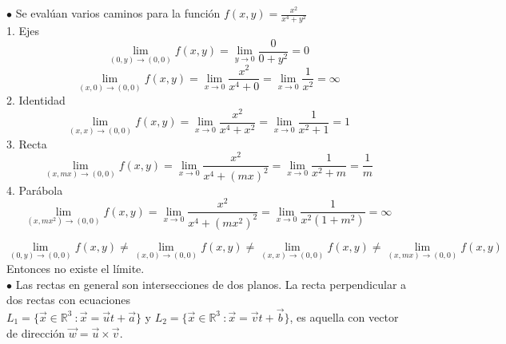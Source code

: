 \documentclass[amsmath,amssymb]{article}
\begin{document}
\noindent $\bullet$ Se evalúan varios caminos para la función $f(x,y)=\frac{x^2}{x^4+y^2}$ \\
1. Ejes \\
$$\lim_{(0,y) \to (0,0)} f(x,y)=\lim_{y \to 0}\frac{0}{0+y^2}=0$$
$$\lim_{(x,0) \to (0,0)} f(x,y)=\lim_{x \to 0} \frac{x^2}{x^4+0}= \lim_{x \to 0} \frac{1}{x^2} = \infty$$
2. Identidad \\
$$\lim_{(x,x) \to (0,0)} f(x,y)=\lim_{x \to 0}\frac{x^2}{x^4+x^2}=\lim_{x \to 0}\frac{1}{x^2+1}=1$$
3. Recta \\
$$\lim_{(x,mx) \to (0,0)} f(x,y)=\lim_{x \to 0}\frac{x^2}{x^4+(mx)^2}=\lim_{x \to 0}\frac{1}{x^2+m}=\frac{1}{m} $$
4. Parábola \\
$$\lim_{(x,mx^2) \to (0,0)} f(x,y)=\lim_{x \to 0}\frac{x^2}{x^4+(mx^2)^2}=\lim_{x \to 0}\frac{1}{x^2(1+m^2)}=\infty $$

$$\lim_{(0,y) \to (0,0)} f(x,y) \neq \lim_{(x,0) \to (0,0)} f(x,y) \neq \lim_{(x,x) \to (0,0)} f(x,y) \neq \lim_{(x,mx) \to (0,0)} f(x,y) $$
Entonces no existe el límite.\\
\noindent $\bullet$ Las rectas en general son intersecciones de dos planos. La recta perpendicular a dos rectas con ecuaciones\\ $L_1=\{\vec{x}\in \mathbb{R}^3\ : \vec{x}=\vec{u}t+\vec{a}\}$ y $L_2=\{\vec{x}\in \mathbb{R}^3\ : \vec{x}=\vec{v}t+\vec{b}\}$, es aquella con vector de dirección $\vec{w}=\vec{u} \times \vec{v}$.
\end{document}
